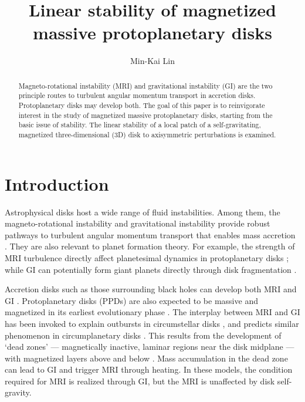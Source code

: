 \documentclass[iop]{emulateapj}
\begin{document}
\title{Linear stability of magnetized massive protoplanetary disks}


\author{Min-Kai Lin }%

\begin{abstract}
  Magneto-rotational instability (MRI) and gravitational instability
  (GI) are the two principle routes to turbulent angular momentum
  transport in accretion disks. Protoplanetary disks may develop
  both. The goal of this paper is to reinvigorate interest in the study of
  magnetized  massive protoplanetary disks, starting from the basic
  issue of stability. The linear stability of a local patch of a
  self-gravitating, magnetized three-dimensional (3D) disk to
  axisymmetric perturbations is examined. %

%
\end{abstract}

\section{Introduction}
Astrophysical disks host a wide range of fluid instabilities. Among
them, the magneto-rotational instability \citep[MRI,][]{chandrasekhar61,
  balbus91,balbus98} %
and gravitational instability \citep[GI, ][]{toomre64,goldreich65a,goldreich65b} 
provide robust pathways to turbulent angular momentum transport that
enables mass accretion \citep[][ 
  and references therein]{balbus99,armitage11,turner14}.   
They are also relevant to planet formation theory. For example,
the strength of MRI turbulence directly affect planetesimal dynamics
in protoplanetary disks \citep{yang12,gressel12}; while GI can
potentially form giant planets directly through disk fragmentation
\citep{boss97,boss98,gammie01,voro13,helled14}. 

Accretion disks such as those surrounding black holes can develop both
MRI and GI \citep{menou01,goodman03}.  
Protoplanetary disks (PPDs) are also expected to be massive and  
magnetized in its earliest evolutionary phase \citep{inutsuka10}.  
The interplay between MRI and GI has been invoked to explain outbursts
in circumstellar disks \citep{armitage01, zhu10a, zhu10b,
  martin12b}, and predicts similar phenomenon in circumplanetary disks
\citep{lubow12}. This results from the development of `dead zones' 
--- magnetically inactive, laminar regions near the disk midplane --- with
magnetized layers above and below 
\citep{gammie96,martin12,landry13}. Mass accumulation in the dead zone can lead to
GI and trigger MRI through heating. In these models, the condition required
for MRI is realized through GI, but the MRI is unaffected by disk
self-gravity. 
\end{document}
